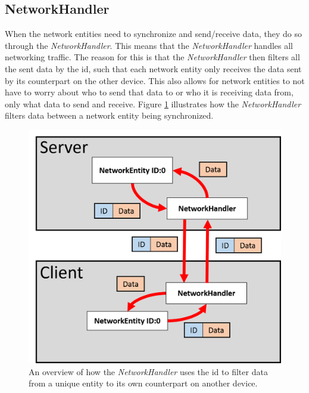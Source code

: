 \subsection{NetworkHandler}
When the network entities need to synchronize and send/receive data, they do so through the \emph{NetworkHandler}.
This means that the \emph{NetworkHandler} handles all networking traffic.
The reason for this is that the \emph{NetworkHandler} then filters all the sent data by the id, such that each network entity only receives the data sent by its counterpart on the other device.
This also allows for network entities to not have to worry about who to send that data to or who it is receiving data from, only what data to send and receive.
Figure \ref{fig:networkHandler} illustrates how the \emph{NetworkHandler} filters data between a network entity being synchronized.

\begin{figure}
\includegraphics[scale=0.5]{figures/network/networkHandler}
\caption{An overview of how the \emph{NetworkHandler} uses the id to filter data from a unique entity to its own counterpart on another device.}
\label{fig:networkHandler}
\end{figure}